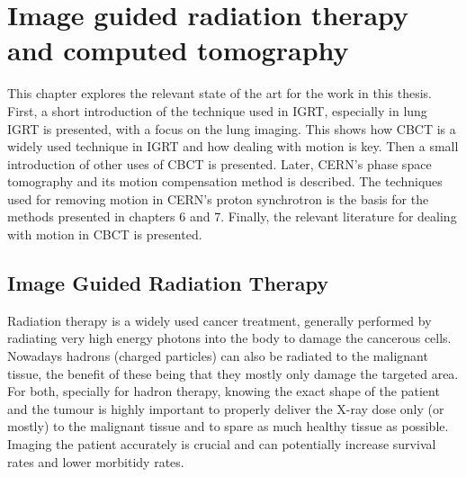 \chapter{Image guided radiation therapy and computed tomography}\label{ch:soa}

This chapter explores the relevant state of the art for the work in this thesis. First, a short introduction of the technique used in IGRT, especially in lung IGRT is presented, with a focus on the lung imaging. This shows how CBCT is a widely used technique in IGRT and how dealing with motion is key. Then a small introduction of other uses of CBCT is presented. Later, CERN's phase space tomography and its motion compensation method is described. The techniques used for removing motion in CERN's proton synchrotron is the basis for the methods presented in chapters 6 and 7. Finally, the relevant literature for dealing with motion in CBCT is presented.


\section{Image Guided Radiation Therapy}
Radiation therapy is a widely used cancer treatment, generally performed by radiating very high energy photons into the body to damage the cancerous cells. Nowadays hadrons (charged particles) can also be radiated to the malignant tissue, the benefit of these being that they mostly only damage the targeted area. For both, specially for hadron therapy, knowing the exact shape of the patient and the tumour is highly important to properly deliver the X-ray dose only (or mostly) to the malignant tissue and to spare as much healthy tissue as possible. Imaging the patient accurately is crucial and can potentially increase survival rates and lower morbitidy rates\cite{nguyen2015potential}.

